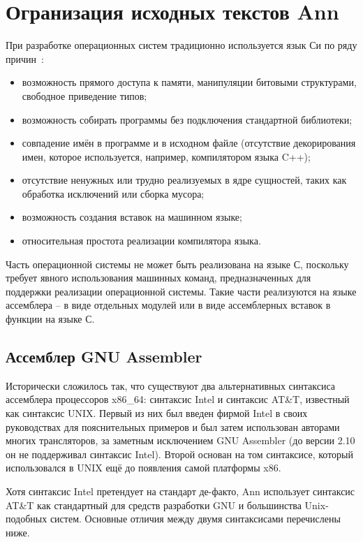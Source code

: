 \chapter{Огранизация исходных текстов Ann}
\label{cha:sources}

При разработке операционных систем традиционно используется язык Си по ряду
причин~\cite{mstu_os_dev_method}:
\begin{itemize}
\item возможность прямого доступа к памяти, манипуляции битовыми структурами,
	свободное приведение типов;
\item возможность собирать программы без подключения стандартной библиотеки;
\item совпадение имён в программе и в исходном файле (отсутствие
	декорирования имен, которое используется, например, компилятором языка
	C++);
\item отсутствие ненужных или трудно реализуемых в ядре сущностей, таких как
обработка исключений или сборка мусора;
\item возможность создания вставок на машинном языке;
\item относительная простота реализации компилятора языка.
\end{itemize}

Часть операционной системы не может быть реализована на языке С, поскольку
требует явного использования машинных команд, предназначенных для поддержки
реализации операционной системы. Такие части реализуются на языке ассемблера
-- в виде отдельных модулей или в виде ассемблерных вставок в функции на языке
С.

\section{Ассемблер GNU Assembler}
Исторически сложилось так, что существуют два альтернативных
синтаксиса ассемблера процессоров x86\_64: синтаксис Intel и синтаксис
AT\&T, известный как синтаксис UNIX. Первый из них был введен фирмой
Intel в своих руководствах для пояснительных примеров и был затем использован
авторами многих трансляторов, за заметным исключением GNU
Assembler (до версии 2.10 он не поддерживал синтаксис Intel). Второй основан
на том синтаксисе, который использовался в UNIX ещё до появления
самой платформы x86.

Хотя синтаксис Intel претендует на стандарт де-факто, Ann использует
синтаксис AT\&T как стандартный для средств разработки GNU и
большинства Unix-подобных систем. Основные отличия между двумя
синтаксисами перечислены ниже.

